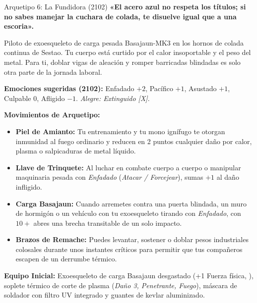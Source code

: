 \begin{FichaArquetipo}{Arquetipo 6: La Fundidora (2102)}
\textbf{«El acero azul no respeta los títulos; si no sabes manejar la cuchara de colada, te disuelve igual que a una escoria».}

Piloto de exoesqueleto de carga pesada Basajaun-MK3 en los hornos de colada continua de Sestao. Tu cuerpo está curtido por el calor insoportable y el peso del metal. Para ti, doblar vigas de aleación y romper barricadas blindadas es solo otra parte de la jornada laboral.

\textbf{Emociones sugeridas (2102):} Enfadado $+2$, Pacífico $+1$, Asustado $+1$, Culpable $0$, Afligido $-1$. \textit{Alegre: Extinguido [X]}.

\textbf{Movimientos de Arquetipo:}
\begin{itemize}
    \item \textbf{Piel de Amianto:} Tu entrenamiento y tu mono ignífugo te otorgan inmunidad al fuego ordinario y reducen en 2 puntos cualquier daño por calor, plasma o salpicaduras de metal líquido.
    \item \textbf{Llave de Trinquete:} Al luchar en combate cuerpo a cuerpo o manipular maquinaria pesada con \textit{Enfadado} (\textit{Atacar / Forcejear}), sumas $+1$ al daño infligido.
    \item \textbf{Carga Basajaun:} Cuando arremetes contra una puerta blindada, un muro de hormigón o un vehículo con tu exoesqueleto tirando con \textit{Enfadado}, con $10+$ abres una brecha transitable de un solo impacto.
    \item \textbf{Brazos de Remache:} Puedes levantar, sostener o doblar pesos industriales colosales durante unos instantes críticos para permitir que tus compañeros escapen de un derrumbe térmico.
\end{itemize}

\textbf{Equipo Inicial:} Exoesqueleto de carga Basajaun desgastado (+1 Fuerza física, ), soplete térmico de corte de plasma (\textit{Daño 3, Penetrante, Fuego}), máscara de soldador con filtro UV integrado y guantes de kevlar aluminizado.
\end{FichaArquetipo}

\vspace{1em}

